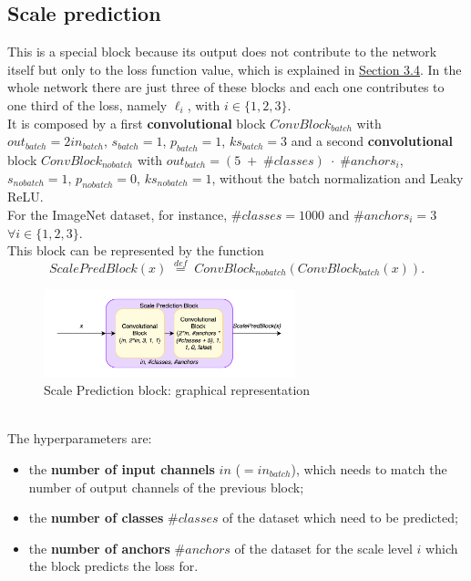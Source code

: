 \documentclass[../report.tex]{subfiles}
\begin{document}
\subsection{Scale prediction}\label{ss:network-blocks-scale-prediction}
This is a special block because its output does not contribute to the network itself but only to the loss function value, which is explained in \hyperref[s:loss-function]{Section 3.4}.
In the whole network there are just three of these blocks and each one contributes to one third of the loss, namely $\ell_i$, with $i \in{} {\{1,2,3\}}$.\\
It is composed by a first \textbf{convolutional} block $ConvBlock_{batch}$ with $out_{batch} = 2in_{batch}$, $s_{batch} = 1$, $p_{batch} = 1$, $ks_{batch} = 3$ and a second \textbf{convolutional} block $ConvBlock_{nobatch}$ with $out_{batch} = (5 \; + \; \#classes) \; \cdot{} \; \#anchors_i$, $s_{nobatch} = 1$, $p_{nobatch} = 0$, $ks_{nobatch} = 1$, without the batch normalization and Leaky ReLU.\\
For the ImageNet dataset, for instance, $\#classes = 1000$ and $\#anchors_i = 3$ $\forall{} i \in{} {\{1,2,3\}}$.\\
This block can be represented by the function $$ScalePredBlock(x) \; \stackrel{def}{=} \; ConvBlock_{nobatch}(ConvBlock_{batch}(x)).$$
\begin{figure}[h]
    \centering
    \includegraphics[width=0.65\textwidth]{assets/images/scaleprediction_block}
    \caption{Scale Prediction block: graphical representation}\label{img:scaleprediction_block}
\end{figure}\\
The hyperparameters are:
\begin{itemize}
    \item the \textbf{number of input channels} $in$ ($= in_{batch}$), which needs to match the number of output channels of the previous block;
    \item the \textbf{number of classes} $\#classes$ of the dataset which need to be predicted;
    \item the \textbf{number of anchors} $\#anchors$ of the dataset for the scale level $i$ which the block predicts the loss for.
\end{itemize}
\end{document}
